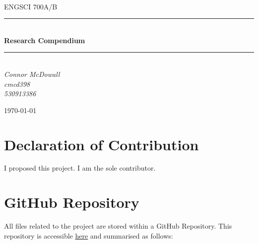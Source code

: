 \documentclass[12pt]{article}
\begin{document}
\begin{titlepage}
	\newcommand{\HRule}{\rule{\linewidth}{0.5mm}} %
	
	\center
	
	
	\textsc{\LARGE }\\[1.5cm] %
	
	\textsc{\Large ENGSCI 700A/B}\\[0.5cm] %
	
	
	\HRule\\[0.5cm]
	
	{\huge\bfseries Research Compendium}\\[0.4cm] %
	
	\HRule\\[0.5cm]
	
	
	{\large\textit{Connor McDowall \\cmcd398 \\530913386}}\\
	
	
	\vfill\vfill\vfill %
	
	{\large\today} %
	 
	
	\vfill %
	
\end{titlepage}
\section*{Declaration of Contribution}
I proposed this project. I am the sole contributor.
\tableofcontents
\listoffigures
\newpage
\section{GitHub Repository}
All files related to the project are stored within a GitHub Repository.
This repository is accessible \href{https://github.com/CMCD1996/GOCPI}{here} and summarised as follows:
\end{document}
